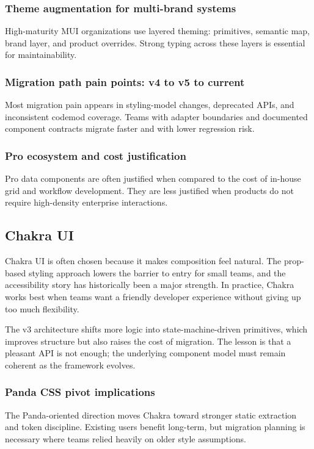 \documentclass[11pt,twoside,a4paper]{article}
\begin{document}
\subsubsection{Theme augmentation for multi-brand systems}
High-maturity MUI organizations use layered theming: primitives, semantic map, brand layer, and product overrides. Strong typing across these layers is essential for maintainability.

\subsubsection{Migration path pain points: v4 to v5 to current}
Most migration pain appears in styling-model changes, deprecated APIs, and inconsistent codemod coverage. Teams with adapter boundaries and documented component contracts migrate faster and with lower regression risk.

\subsubsection{Pro ecosystem and cost justification}
Pro data components are often justified when compared to the cost of in-house grid and workflow development. They are less justified when products do not require high-density enterprise interactions.

\subsection{Chakra UI}
Chakra UI is often chosen because it makes composition feel natural. The prop-based styling approach lowers the barrier to entry for small teams, and the accessibility story has historically been a major strength. In practice, Chakra works best when teams want a friendly developer experience without giving up too much flexibility.

The v3 architecture shifts more logic into state-machine-driven primitives, which improves structure but also raises the cost of migration. The lesson is that a pleasant API is not enough; the underlying component model must remain coherent as the framework evolves.

\subsubsection{Panda CSS pivot implications}
The Panda-oriented direction moves Chakra toward stronger static extraction and token discipline. Existing users benefit long-term, but migration planning is necessary where teams relied heavily on older style assumptions.
\end{document}
